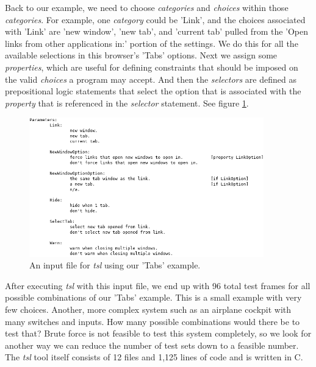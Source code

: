 \documentclass[a4full,12pt]{article}
\begin{document}
Back to our example, we need to choose \emph{categories} and \emph{choices} within those
  \emph{categories}. For example, one \emph{category} could be 'Link', and the choices
  associated with 'Link' are 'new window', 'new tab', and 'current tab' pulled from the
  'Open links from other applications in:' portion of the settings. We do this for all
  the available selections in this browser's 'Tabs' options. Next we assign some 
  \emph{properties}, which are useful for defining constraints that should be imposed on
  the valid \emph{choices} a program may accept. And then the \emph{selectors} are defined
  as prepositional logic statements that select the option that is associated with the 
  \emph{property} that is referenced in the \emph{selector} statement. See figure \ref{fig:tsl_input_final}.
\begin{figure}[htb]
\centering
\includegraphics[width=4in,keepaspectratio]{images/tsl_input_final.png}
\caption{An input file for \emph{tsl} using our 'Tabs' example.}
\label{fig:tsl_input_final}
\end{figure}

After executing \emph{tsl} with this input file, we end up with 96 total test frames
  for all possible combinations of our 'Tabs' example. This is a small example with very
  few choices. Another, more complex system such as an airplane cockpit with many switches
  and inputs. How many possible combinations would there be to test that? Brute force is not
  feasible to test this system completely, so we look for another way we can reduce the number
  of test sets down to a feasible number. The \emph{tsl} tool itself consists of 12 files and
  1,125 lines of code and is written in C.
\end{document}
